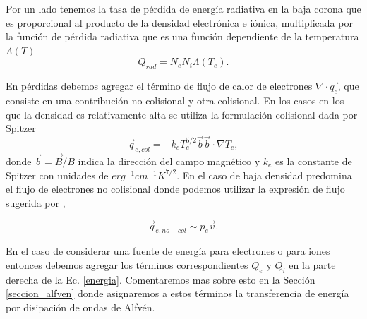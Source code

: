 \documentclass[a4paper,11pt]{report}
\begin{document}
Por un lado tenemos la tasa de pérdida de energía radiativa en la baja corona que es proporcional al producto de la densidad electrónica e iónica, multiplicada por la función de pérdida radiativa que es una función dependiente de la temperatura $\Lambda(T)$
\begin{equation}
  Q_{rad} = N_e N_i \Lambda(T_e). \label{qrad}
\end{equation}


En pérdidas debemos agregar el término de flujo de calor de electrones $\nabla \cdot \vec{q_e}$, que consiste en una contribución no colisional y otra colisional. En los casos en los que la densidad es relativamente alta se utiliza la formulación colisional dada por Spitzer \citep{spitzer_1953}
\begin{equation}
   \vec{q}_{e,col} = - k_e T_e ^{5/2}\vec{b}\vec{b} \cdot \nabla T_e, \label{qe_col}
\end{equation}
donde $\vec{b}=\vec{B}/B$ indica la dirección del campo magnético y $k_e$ es la constante de Spitzer con unidades de $erg^{-1} cm^{-1} K^{7/2}$. En el caso de baja densidad predomina el flujo de electrones no colisional donde podemos utilizar la expresión de flujo sugerida por \citet{hollweg_1978},

\begin{equation}
   \vec{q}_{e,no-col} \sim p_e \vec{v}. \label{qe_nocol}
\end{equation}



En el caso de considerar una fuente de energía para electrones o para iones entonces debemos agregar los términos correspondientes $Q_e$ y $Q_i$ en la parte derecha de la Ec. \ref{energia}. {Comentaremos mas sobre esto en la Sección \ref{seccion_alfven} donde asignaremos a estos términos la transferencia de energía por disipación de ondas de Alfvén.}
\end{document}
